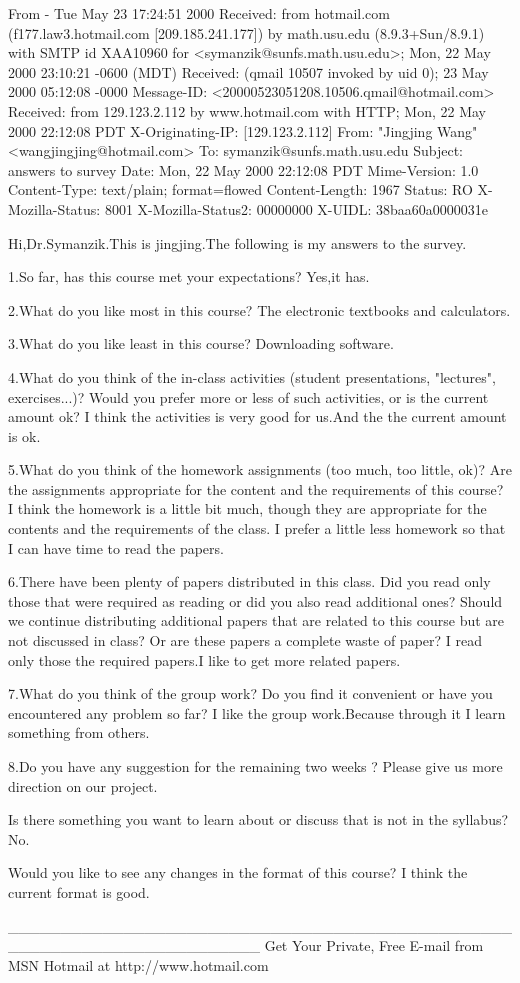 From - Tue May 23 17:24:51 2000
Received: from hotmail.com (f177.law3.hotmail.com [209.185.241.177])
	by math.usu.edu (8.9.3+Sun/8.9.1) with SMTP id XAA10960
	for <symanzik@sunfs.math.usu.edu>; Mon, 22 May 2000 23:10:21 -0600 (MDT)
Received: (qmail 10507 invoked by uid 0); 23 May 2000 05:12:08 -0000
Message-ID: <20000523051208.10506.qmail@hotmail.com>
Received: from 129.123.2.112 by www.hotmail.com with HTTP;
	Mon, 22 May 2000 22:12:08 PDT
X-Originating-IP: [129.123.2.112]
From: "Jingjing Wang" <wangjingjing@hotmail.com>
To: symanzik@sunfs.math.usu.edu
Subject: answers to survey
Date: Mon, 22 May 2000 22:12:08 PDT
Mime-Version: 1.0
Content-Type: text/plain; format=flowed
Content-Length: 1967
Status: RO
X-Mozilla-Status: 8001
X-Mozilla-Status2: 00000000
X-UIDL: 38baa60a0000031e

Hi,Dr.Symanzik.This is jingjing.The following is my answers to the survey.

1.So far, has this course met your expectations?
  Yes,it has.

2.What do you like most in this course?
  The electronic textbooks and calculators.

3.What do you like least in this course?
  Downloading software.

4.What do you think of the in-class activities (student presentations,  
"lectures", exercises...)? Would you prefer more or less of such   
activities, or is the current amount ok?
   I think the activities is very good for us.And the the current amount is 
ok.

5.What do you think of the homework assignments (too much, too little,  ok)? 
Are the assignments appropriate for the content and the  requirements of 
this course?
   I think the homework is a little bit much, though they are appropriate 
for the contents and the requirements of the class. I prefer a little less 
homework so that I can have time to read the papers.

6.There have been plenty of papers distributed in this class. Did you read 
only those that were required as reading or did you also read additional 
ones?
Should we continue distributing additional papers that are related to this 
course but are not discussed in class? Or are these papers a complete waste 
of
    paper?
   I read only those the required papers.I like to get more related papers.

7.What do you think of the group work? Do you find it convenient or have you 
encountered any problem so far?
  I like the group work.Because through it I learn something from others.

8.Do you have any suggestion for the remaining two weeks ?
  Please give us more direction on our project.

  Is there something you want to learn about or discuss that is not in the
  syllabus?
   No.

  Would you like to see any changes in the format of this course?
   I think the current format is good.


________________________________________________________________________
Get Your Private, Free E-mail from MSN Hotmail at http://www.hotmail.com

